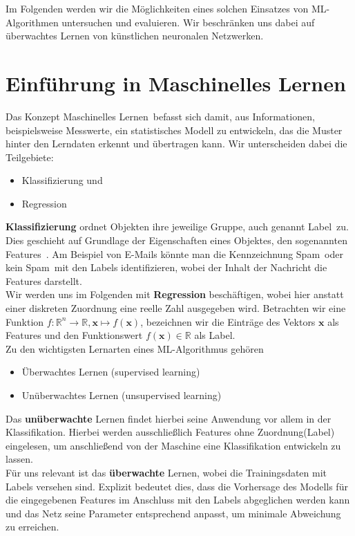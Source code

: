 Im Folgenden werden wir die Möglichkeiten eines solchen Einsatzes von ML-Algorithmen untersuchen und evaluieren. Wir beschränken uns dabei auf überwachtes Lernen von künstlichen neuronalen Netzwerken. 
\section{Einführung in Maschinelles Lernen}
Das Konzept \glqq Maschinelles Lernen\grqq~befasst sich damit, aus Informationen, beispielsweise Messwerte, ein statistisches Modell zu entwickeln, das die Muster hinter den Lerndaten erkennt und übertragen kann. Wir unterscheiden dabei die Teilgebiete:
\begin{itemize}
	\setlength\itemsep{0.1cm}
	\setlength{\parskip}{0.1cm}
	\item Klassifizierung und 
	\item Regression
\end{itemize}
\textbf{Klassifizierung} ordnet Objekten ihre jeweilige Gruppe, auch genannt \glqq Label\grqq~zu. Dies geschieht auf Grundlage der Eigenschaften eines Objektes, den sogenannten \glqq Features\grqq~. Am Beispiel von E-Mails könnte man die Kennzeichnung \glqq Spam\grqq~oder \glqq kein Spam\grqq~mit den Labels identifizieren, wobei der Inhalt der Nachricht die Features darstellt.\\
Wir werden uns im Folgenden mit \textbf{Regression} beschäftigen, wobei hier anstatt einer diskreten Zuordnung eine reelle Zahl ausgegeben wird. Betrachten wir eine Funktion $f: \mathbb{R}^n \rightarrow \mathbb{R}, \mathbf{x} \mapsto f(\mathbf{x})$, bezeichnen wir die Einträge des Vektors $\mathbf{x}$ als Features und den Funktionswert $f(\mathbf{x}) \in \mathbb{R}$ als Label.\\
Zu den wichtigsten Lernarten eines ML-Algorithmus gehören
\begin{itemize}
	\setlength\itemsep{0.1cm}
	\setlength{\parskip}{0.1cm}
	\item Überwachtes Lernen (supervised learning)
	\item Unüberwachtes Lernen (unsupervised learning)
\end{itemize}
Das \textbf{unüberwachte} Lernen findet hierbei seine Anwendung vor allem in der Klassifikation. Hierbei werden ausschließlich Features ohne Zuordnung(Label) eingelesen, um anschließend von der Maschine eine Klassifikation entwickeln zu lassen. \\
Für uns relevant ist das \textbf{überwachte} Lernen, wobei die Trainingsdaten mit Labels versehen sind. Explizit bedeutet dies, dass die Vorhersage des Modells für die eingegebenen Features im Anschluss mit den Labels abgeglichen werden kann und das Netz seine Parameter entsprechend anpasst, um minimale Abweichung zu erreichen. \\
